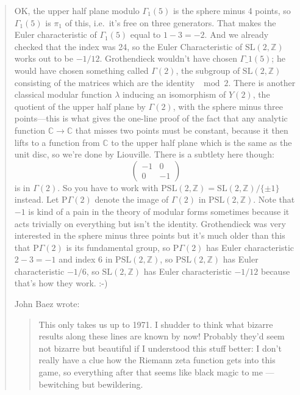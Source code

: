 \documentclass{article}
\begin{document}
\begin{quote}
OK, the upper half plane modulo \(\Gamma_1(5)\) is the sphere minus 4
points, so \(\Gamma_1(5)\) is \(\pi_1\) of this, i.e.~it's free on three
generators. That makes the Euler characteristic of \(\Gamma_1(5)\) equal
to \(1-3=-2\). And we already checked that the index was 24, so the
Euler Characteristic of \(\mathrm{SL}(2,\mathbb{Z})\) works out to be
\(-1/12\). Grothendieck wouldn't have chosen $\Gamma\_1(5)$; he would have
chosen something called \(\Gamma(2)\), the subgroup of
\(\mathrm{SL}(2,\mathbb{Z})\) consisting of the matrices which are the
identity \(\mod 2\). There is another classical modular function
\(\lambda\) inducing an isomorphism of \(Y(2)\), the quotient of the
upper half plane by \(\Gamma(2)\), with the sphere minus three
points---this is what gives the one-line proof of the fact that any
analytic function \(\mathbb{C}\to\mathbb{C}\) that misses two points
must be constant, because it then lifts to a function from
\(\mathbb{C}\) to the upper half plane which is the same as the unit
disc, so we're done by Liouville. There is a subtlety here though: \[
  \left(\begin{array}{rr}-1&0\\0&-1\end{array}\right)
\] is in \(\Gamma(2)\). So you have to work with
\(\mathrm{PSL}(2,\mathbb{Z})=\mathrm{SL}(2,\mathbb{Z})/\{\pm1\}\)
instead. Let \(\mathrm{P}\Gamma(2)\) denote the image of \(\Gamma(2)\)
in \(\mathrm{PSL}(2,\mathbb{Z})\). Note that \(-1\) is kind of a pain in
the theory of modular forms sometimes because it acts trivially on
everything but isn't the identity. Grothendieck was very interested in
the sphere minus three points but it's much older than this that
\(\mathrm{P}\Gamma(2)\) is its fundamental group, so
\(\mathrm{P}\Gamma(2)\) has Euler characteristic \(2-3=-1\) and index 6
in \(\mathrm{PSL}(2,\mathbb{Z})\), so \(\mathrm{PSL}(2,\mathbb{Z})\) has
Euler characteristic \(-1/6\), so \(\mathrm{SL}(2,\mathbb{Z})\) has
Euler characteristic \(-1/12\) because that's how they work. :-)

John Baez wrote:

\begin{quote}
This only takes us up to 1971. I shudder to think what bizarre results
along these lines are known by now! Probably they'd seem not bizarre but
beautiful if I understood this stuff better: I don't really have a clue
how the Riemann zeta function gets into this game, so everything after
that seems like black magic to me --- bewitching but bewildering.
\end{quote}


\end{quote}
\end{document}
